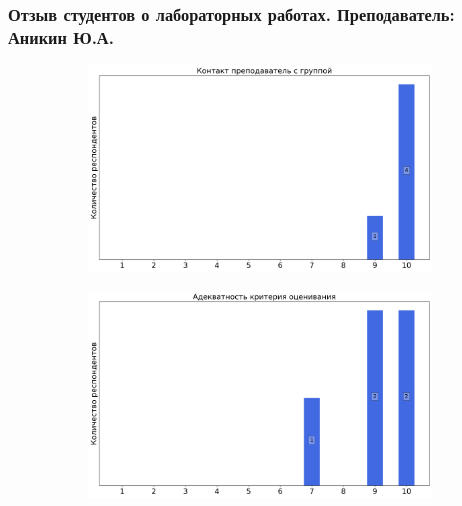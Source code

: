         \subsubsection{Отзыв студентов о лабораторных работах. Преподаватель: Аникин Ю.А.}
            \begin{figure}[H]
                \centering
                \begin{subfigure}[b]{0.45\textwidth}
                    \centering
                    \includegraphics[width=\textwidth]{images/3 course/Общая физика - квантовая физика/labniks-marks-Аникин Ю.А.-0.png}
                \end{subfigure}
                \begin{subfigure}[b]{0.45\textwidth}
                    \centering
                    \includegraphics[width=\textwidth]{images/3 course/Общая физика - квантовая физика/labniks-marks-Аникин Ю.А.-1.png}
                \end{subfigure}
                \begin{subfigure}[b]{0.45\textwidth}

\end{subfigure}
\end{figure}
